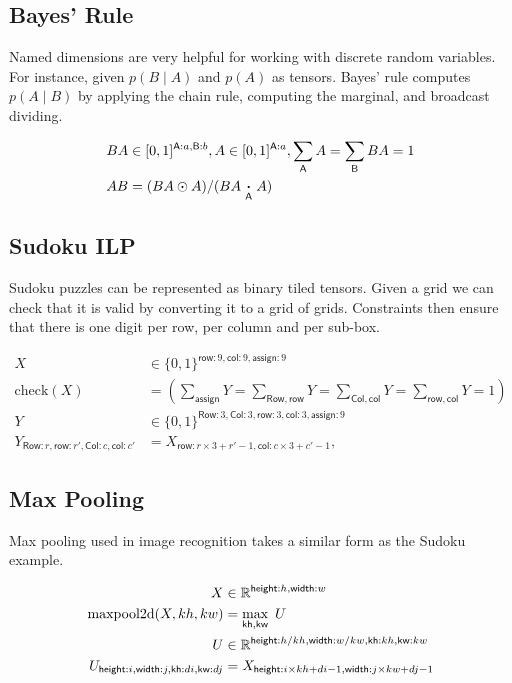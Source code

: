 \documentclass{article}
\newcommand{\name}[1]{\mathsf{#1}}
\newcommand{\ndot}[1]{\mathbin{\mathop{\thinspace\boldsymbol\cdot\thinspace}\displaylimits_{\name{#1}}}}
\newcommand{\nsum}[1]{\mathop{\sum}_{\name{#1}}}
\newcommand{\nfun}[2]{\mathop{\text{#2}}\displaylimits_{\name{#1}}}
\newcommand{\reals}{\mathbb{R}}
\begin{document}
\subsection{Bayes' Rule}

Named dimensions are very helpful for working with discrete random
variables. For instance, given $p(B \mid A)$ and $p(A)$ as
tensors. Bayes' rule computes $p(A \mid B)$ by applying the chain
rule, computing the marginal, and broadcast dividing.

\begin{align*} 
BA &\in [0, 1]^{\name{A}:a, \name{B}:b}, 
A \in [0, 1]^{\name{A}:a}, \nsum{A} A =  \nsum{B} BA =  1 \\
AB &= (BA \odot A)  / (BA \ndot{A} A)
\end{align*}

\subsection{Sudoku ILP}

Sudoku puzzles can be represented as  binary tiled tensors.
Given a grid we can check that it is valid by converting it to a grid of grids. 
Constraints then ensure that there is one digit per row, per column and per sub-box. 

\begin{align*} 
X &\in \{0, 1\}^{\name{row}: 9, \name{col}:9, \name{assign}:9}  \\
\text{check}(X) &=
\left(\nsum{assign} Y = 
\nsum{Row,row} Y = 
\nsum{Col, col} Y =  
\nsum{row, col} Y = 1 \right) \\
Y &\in \{0, 1\}^{\name{Row}: 3, \name{Col}:3, \name{row}: 3, \name{col}:3, \name{assign}:9}  \\
Y_{\name{Row}:r, \name{row}:r', \name{Col}:c, \name{col}:c'} &= X_{\name{row}:r\times 3 + r'-1, \name{col}:c\times3 + c'-1}, 
\end{align*} 


\subsection{Max Pooling}

Max pooling used in image recognition takes a similar form as the Sudoku example.

\begin{align*} 
X &\in \reals^{\name{height}: h, \name{width}:w} \\
\text{maxpool2d}(X, kh, kw) &=  \nfun{kh, kw}{max}\  U \\
U &\in \reals^{{\name{height}:h / kh,
\name{width}:w / kw, \name{kh}:kh, \name{kw}:kw}}  \\
U_{\name{height}:i, \name{width}:j, \name{kh}:di, \name{kw}:dj  } & = X_{\name{height}:i \times kh + di -1, \name{width}:j \times kw + dj -1}  
\end{align*}
\end{document}
